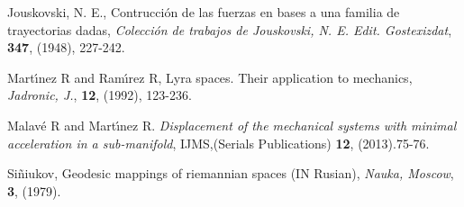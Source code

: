\begin{titlepage}
\begin{thebibliography}{99}
 Jouskovski, N. E.,  Contrucci\'on de las fuerzas en bases a una familia de trayectorias dadas,  \textit{Colecci\'{o}n de trabajos de Jouskovski, N. E. Edit. Gostexizdat}, {\bf 347}, (1948), 227-242.

  Mart\'{\i}nez R and Ram\'{\i}rez R, Lyra spaces. Their application to mechanics, \textit{Jadronic, J.}, {\bf 12}, (1992), 123-236.

 Malav\'e R and Mart\'{\i}nez R.  \textit{Displacement of the mechanical systems with minimal acceleration in a sub-manifold}, IJMS,(Serials Publications) {\bf 12}, (2013).75-76.

 Si\~niukov, Geodesic mappings of riemannian spaces (IN Rusian), \textit{Nauka, Moscow}, {\bf 3}, (1979).
\end{thebibliography}
\end{titlepage}

